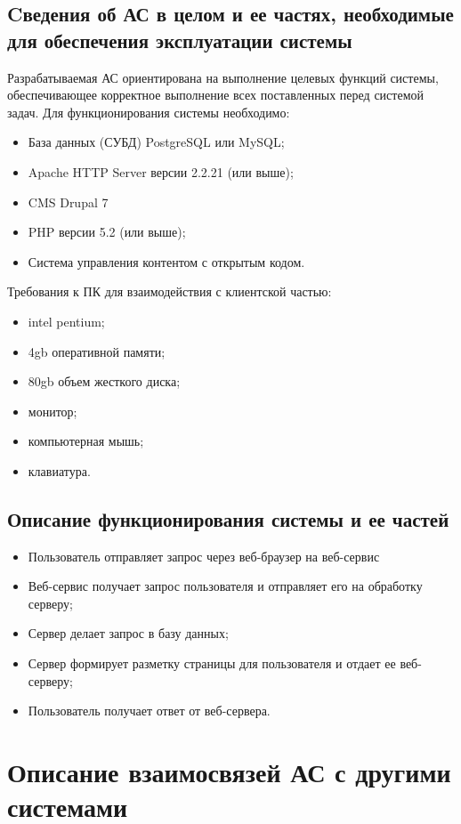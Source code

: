 \documentclass[russian, utf8, 12pt,pointsubsection,floatsubsection]{eskdtext}
\begin{document}
\subsection{Cведения об АС в целом и ее частях, необходимые для обеспечения эксплуатации системы}
Разрабатываемая АС ориентирована на выполнение целевых функций системы, обеспечивающее корректное выполнение всех поставленных перед системой задач. Для функционирования системы необходимо:
\begin{itemize}
\item База данных (СУБД) PostgreSQL или MySQL;
\item Apache HTTP Server версии 2.2.21 (или выше);
\item CMS Drupal 7
\item PHP версии 5.2 (или выше);
\item Система управления контентом с открытым кодом.
\end{itemize}

Требования к ПК для взаимодействия с клиентской частью:
\begin{itemize}
    \item intel pentium;
    \item 4gb оперативной памяти;
    \item 80gb объем жесткого диска;
    \item монитор;
    \item компьютерная мышь;
    \item клавиатура.
\end{itemize}


\subsection{Описание функционирования системы и ее частей}
\begin{itemize}
    \item Пользователь отправляет запрос через веб-браузер на веб-сервис
    \item Веб-сервис получает запрос пользователя и отправляет его на обработку серверу;
    \item Сервер делает запрос в базу данных;
    \item Сервер формирует разметку страницы для пользователя и отдает ее веб-серверу;
    \item Пользователь получает ответ от веб-сервера.
\end{itemize}

\section{Описание взаимосвязей АС с другими системами}
\end{document}
